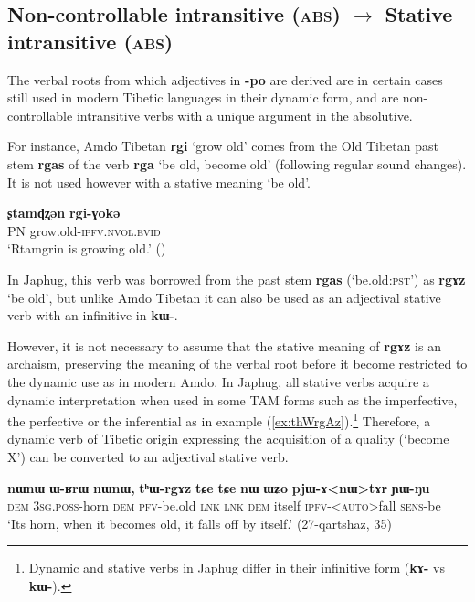 \documentclass[oneside,a4paper,11pt]{article}
\newcommand{\ipa}[1]{{\phon\textbf{\mbox{#1}}}} %
\newcommand{\refb}[1]{(\ref{#1})}
\begin{document}
  
\subsection{Non-controllable intransitive (\textsc{abs}) $\rightarrow$ Stative intransitive (\textsc{abs})}
The verbal roots from which adjectives in \ipa{-po} are derived are in certain cases still used in modern Tibetic languages in their dynamic form, and are non-controllable intransitive verbs with a unique argument in the absolutive.

For instance, Amdo Tibetan \ipa{rgi} `grow old' comes from the Old Tibetan past stem \ipa{rgas} of the verb \ipa{rga} `be old, become old' (following regular sound changes). It is not used however with a stative meaning `be old'.

\begin{exe}
\ex \label{ex:rgi}
\gll
\ipa{ʂtamɖʐən} 	\ipa{rgi-ɣokə}  	 \\
PN grow.old-\textsc{ipfv.nvol.evid} \\
\glt `Rtamgrin is growing old.' (\citealt[123, ex. 548]{haller04themchen})
\end{exe}

In Japhug, this verb was borrowed from the past stem \ipa{rgas} (`be.old:\textsc{pst}') as \ipa{rgɤz} `be old', but unlike Amdo Tibetan it can also be used as an adjectival stative verb with an infinitive in \ipa{kɯ-}. 

However, it is not necessary to assume that the stative meaning of \ipa{rgɤz} is an archaism, preserving the meaning of the verbal root before it become restricted to the dynamic use as in modern Amdo. In Japhug, all stative verbs acquire a dynamic interpretation when used in some TAM forms such as the imperfective, the perfective or the inferential as in example \refb{ex:thWrgAz}.\footnote{Dynamic and stative verbs in Japhug differ in their infinitive form (\ipa{kɤ-} vs \ipa{kɯ-}). } Therefore, a dynamic verb of Tibetic origin expressing the acquisition of a quality (`become X') can be converted to an adjectival stative verb.

\begin{exe}
\ex \label{ex:thWrgAz}
\gll
\ipa{nɯnɯ}  	\ipa{ɯ-ʁrɯ}  	\ipa{nɯnɯ,}  	\ipa{tʰɯ-rgɤz}  	\ipa{tɕe}  	\ipa{tɕe}  	\ipa{nɯ}  	\ipa{ɯʑo}  	\ipa{pjɯ-ɤ<nɯ>tɤr}  	\ipa{ɲɯ-ŋu}  \\
\textsc{dem} \textsc{3sg.poss}-horn \textsc{dem} \textsc{pfv}-be.old \textsc{lnk}  \textsc{lnk} \textsc{dem} itself \textsc{ipfv}-<\textsc{auto}>fall \textsc{sens}-be \\
\glt `Its horn, when it becomes old, it falls off by itself.' (27-qartshaz, 35)
\end{exe}
\end{document}
